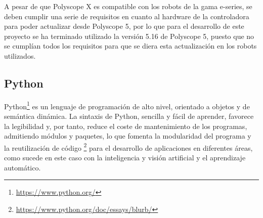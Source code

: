 

A pesar de que Polyscope X es compatible con los robots de la gama e-series, se deben cumplir una serie de requisitos en cuanto al hardware de la controladora para poder actualizar desde Polyscope 5, por lo que para el desarrollo de este proyecto se ha terminado utilizado la versión 5.16 de Polyscope 5, puesto que no se cumplían todos los requisitos para que se diera esta actualización en los robots utilizados.

\subsection{Python}
\label{sec:python}
Python\footnote{\url{https://www.python.org/}} es un lenguaje de programación de alto nivel, orientado a objetos y de semántica dinámica. La sintaxis de Python, sencilla y fácil de aprender, favorece la legibilidad y, por tanto, reduce el coste de mantenimiento de los programas, admitiendo módulos y paquetes, lo que fomenta la modularidad del programa y la reutilización de código \footnote{\url{https://www.python.org/doc/essays/blurb/}} para el desarrollo de aplicaciones en diferentes áreas, como sucede en este caso con la inteligencia y visión artificial y el aprendizaje automático. 
\pagebreak

